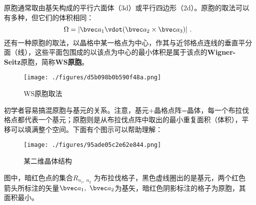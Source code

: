 原胞通常取由基矢构成的平行六面体（3d）或平行四边形（2d）。原胞的取法可以有多种，但它们的体积相同：
\begin{equation}
\Omega = |\bvec a_1 \vdot ( \bvec a_2 \times \bvec a_3)|~.
\end{equation}
还有一种原胞的取法，以晶格中某一格点为中心，作其与近邻格点连线的垂直平分面（线），这些平面包围成的以该点为中心的最小体积是属于该点的\textbf{Wigner-Seitz}原胞，简称\textbf{WS原胞}。

\begin{figure}[ht]
\centering
\texttt{[image: ./figures/d5b098b0b590f48a.png]}
\caption{WS原胞取法} \label{fig_BraLat_5}
\end{figure}

初学者容易搞混原胞与基元的关系。注意，基元+晶格点阵=晶体，每一个布拉伐格点都代表一个基元；原胞则是从布拉伐点阵中取出的最小重复面积（体积），平移可以填满整个空间。下面有个图示可以帮助理解：
\begin{figure}[ht]
\centering
\texttt{[image: ./figures/95ade05c2e62e844.png]}
\caption{某二维晶体结构} \label{fig_BraLat_4}
\end{figure}
图中，暗红色点的集合${R_{n_1,~ n_2}}$ 为布拉伐格子，黑色虚线圈出的是基元，两个红色箭头所标注的矢量$\bvec a_1,~ \bvec a_2$为基矢，暗红色阴影标注的格子为原胞，其面积最小。

